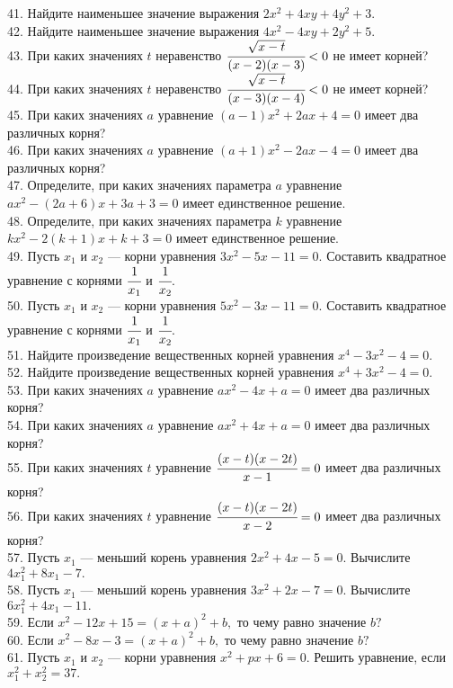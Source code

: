 41. Найдите наименьшее значение выражения $2x^2+4xy+4y^2+3.$\\
42. Найдите наименьшее значение выражения $4x^2-4xy+2y^2+5.$\\
43. При каких значениях $t$ неравенство $\cfrac{\sqrt{x-t}}{(x-2)(x-3)}<0$ не имеет корней?\\
44. При каких значениях $t$ неравенство $\cfrac{\sqrt{x-t}}{(x-3)(x-4)}<0$ не имеет корней?\\
45. При каких значениях $a$ уравнение $(a-1)x^2+2ax+4=0$ имеет два различных корня?\\
46. При каких значениях $a$ уравнение $(a+1)x^2-2ax-4=0$ имеет два различных корня?\\
47. Определите, при каких значениях параметра $a$ уравнение $ax^2-(2a+6)x+3a+3=0$ имеет единственное решение.\\
48. Определите, при каких значениях параметра $k$ уравнение $kx^2-2(k+1)x+k+3=0$ имеет единственное решение.\\
49. Пусть $x_1$ и $x_2$ --- корни уравнения $3x^2-5x-11=0.$ Составить квадратное уравнение с корнями $\cfrac{1}{x_1}$ и $\cfrac{1}{x_2}.$\\
50. Пусть $x_1$ и $x_2$ --- корни уравнения $5x^2-3x-11=0.$ Составить квадратное уравнение с корнями $\cfrac{1}{x_1}$ и $\cfrac{1}{x_2}.$\\
51. Найдите произведение вещественных корней уравнения $x^4-3x^2-4=0.$\\
52. Найдите произведение вещественных корней уравнения $x^4+3x^2-4=0.$\\
53. При каких значениях $a$ уравнение $ax^2-4x+a=0$ имеет два различных корня?\\
54. При каких значениях $a$ уравнение $ax^2+4x+a=0$ имеет два различных корня?\\
55. При каких значениях $t$ уравнение $\cfrac{(x-t)(x-2t)}{x-1}=0$ имеет два различных корня?\\
56. При каких значениях $t$ уравнение $\cfrac{(x-t)(x-2t)}{x-2}=0$ имеет два различных корня?\\
57. Пусть $x_1$ --- меньший корень уравнения $2x^2+4x-5=0.$ Вычислите $4x_1^2+8x_1-7.$\\
58. Пусть $x_1$ --- меньший корень уравнения $3x^2+2x-7=0.$ Вычислите $6x_1^2+4x_1-11.$\\
59. Если $x^2-12x+15=(x+a)^2+b,$ то чему равно значение $b?$\\
60. Если $x^2-8x-3=(x+a)^2+b,$ то чему равно значение $b?$\\
61. Пусть $x_1$ и $x_2$ --- корни уравнения $x^2+px+6=0.$ Решить уравнение, если $x_1^2+x_2^2=37.$\\
